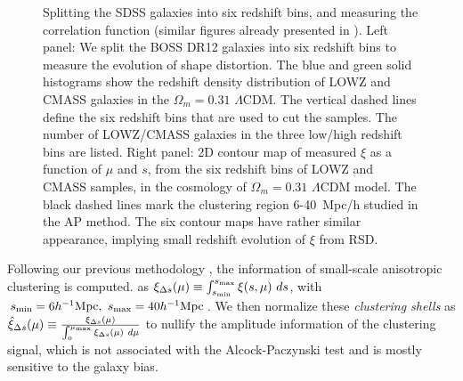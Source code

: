 \documentclass[iop]{emulateapj}
\begin{document}
\begin{figure}
   \caption{\label{fig_TpCF}
   Splitting the SDSS galaxies into six redshift bins, and measuring the correlation function
   (similar figures already presented in \cite{Li2016}).
   Left panel: We split the BOSS DR12 galaxies into six redshift bins to measure the evolution of shape distortion.
   The blue and green solid histograms show the redshift density distribution of LOWZ and CMASS galaxies in the $\Omega_m=0.31$ $\Lambda$CDM. 
   The vertical dashed lines define the six redshift bins that are used to cut the samples.
   The number of LOWZ/CMASS galaxies in the three low/high redshift bins are listed.
   Right panel: 2D contour map of measured $\xi$ as a function of $\mu$ and $s$, from the six redshift bins of LOWZ and CMASS samples, 
      in the cosmology of $\Omega_m=0.31$ $\Lambda$CDM model.
    The black dashed lines mark the clustering region 6-40\ Mpc/h studied in the AP method.
    The six contour maps have rather similar appearance, implying small redshift evolution of $\xi$ from RSD.
   }
\end{figure}

Following our previous methodology \citep{Li2016}, the information of small-scale anisotropic clustering is computed.
as $\xi_{\Delta s} (\mu) \equiv \int_{s_{\rm min}}^{s_{\rm max}} \xi (s,\mu)\ ds$, 
with $s_{\rm min}=6 h^{-1} {\rm Mpc},\ s_{\rm max}=40 h^{-1} {\rm Mpc}$.
We then normalize these {\em clustering shells} as 
$\hat\xi_{\Delta s}(\mu) \equiv \frac{\xi_{\Delta s}(\mu)}{\int_{0}^{\mu_{\rm max}}\xi_{\Delta s}(\mu)\ d\mu}$
to nullify the amplitude information of the clustering signal, 
which is not associated with the Alcock-Paczynski test and is mostly sensitive to the galaxy bias.
\end{document}
